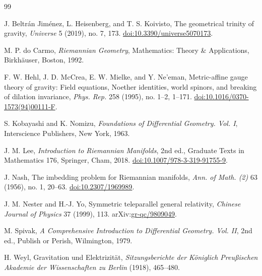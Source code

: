 \documentclass[12pt]{amsart}
\theoremstyle{definition}
\theoremstyle{remark}
\begin{document}
\begin{thebibliography}{99}

J. Beltr\'an Jim\'enez, L. Heisenberg, and T. S. Koivisto,
The geometrical trinity of gravity,
\textit{Universe} 5 (2019), no. 7, 173.
\newblock \href{https://doi.org/10.3390/universe5070173}{doi:10.3390/universe5070173}.

M. P. do Carmo,
\textit{Riemannian Geometry},
Mathematics: Theory \& Applications, Birkh\"auser, Boston, 1992.

F. W. Hehl, J. D. McCrea, E. W. Mielke, and Y. Ne'eman,
Metric-affine gauge theory of gravity: Field equations, Noether identities, world spinors, and breaking of dilation invariance,
\textit{Phys. Rep.} 258 (1995), no. 1--2, 1--171.
\newblock \href{https://doi.org/10.1016/0370-1573(94)00111-F}{doi:10.1016/0370-1573(94)00111-F}.

S. Kobayashi and K. Nomizu,
\textit{Foundations of Differential Geometry. Vol. I},
Interscience Publishers, New York, 1963.

J. M. Lee,
\textit{Introduction to Riemannian Manifolds}, 2nd ed.,
Graduate Texts in Mathematics 176, Springer, Cham, 2018.
\newblock \href{https://doi.org/10.1007/978-3-319-91755-9}{doi:10.1007/978-3-319-91755-9}.

J. Nash,
The imbedding problem for Riemannian manifolds,
\textit{Ann. of Math. (2)} 63 (1956), no. 1, 20--63.
\newblock \href{https://doi.org/10.2307/1969989}{doi:10.2307/1969989}.

J. M. Nester and H.-J. Yo,
Symmetric teleparallel general relativity,
\textit{Chinese Journal of Physics} 37 (1999), 113.
\newblock arXiv:\href{https://arxiv.org/abs/gr-qc/9809049}{gr-qc/9809049}.

M. Spivak,
\textit{A Comprehensive Introduction to Differential Geometry. Vol. II},
2nd ed., Publish or Perish, Wilmington, 1979.

H. Weyl,
Gravitation und Elektrizit\"at,
\textit{Sitzungsberichte der K\"oniglich Preu{\ss}ischen Akademie der Wissenschaften zu Berlin} (1918), 465--480.

\end{thebibliography}
\end{document}
